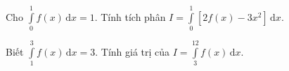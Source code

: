 \begin{ex}%
	Cho $\int\limits_0^1f(x)\mathrm{\,d}x=1$. Tính tích phân $ I=\int\limits_0^1\left[2f(x)-3x^2\right]\mathrm{\,d}x.$\\
\end{ex}

\begin{ex}%
	Biết $\int\limits_1^3f(x)\mathrm{\,d}x=3$. Tính giá trị của $ I=\int\limits_3^12f(x)\mathrm{\,d}x$.\\
\end{ex}




